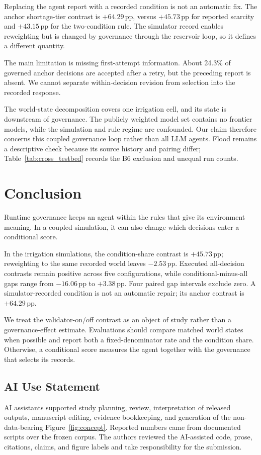 \documentclass{article}
\newcommand{\pp}{\,\mathrm{pp}}
\begin{document}
Replacing the agent report with a recorded condition is not an automatic fix. The anchor shortage-tier contrast is $+64.29\pp$, versus $+45.73\pp$ for reported scarcity and $+43.15\pp$ for the two-condition rule. The simulator record enables reweighting but is changed by governance through the reservoir loop, so it defines a different quantity.

The main limitation is missing first-attempt information. About 24.3\% of governed anchor decisions are accepted after a retry, but the preceding report is absent. We cannot separate within-decision revision from selection into the recorded response.

The world-state decomposition covers one irrigation cell, and its state is downstream of governance. The publicly weighted model set contains no frontier models, while the simulation and rule regime are confounded. Our claim therefore concerns this coupled governance loop rather than all LLM agents. Flood remains a descriptive check because its source history and pairing differ; Table~\ref{tab:cross_testbed} records the B6 exclusion and unequal run counts.

\section{Conclusion}

Runtime governance keeps an agent within the rules that give its environment meaning. In a coupled simulation, it can also change which decisions enter a conditional score.

In the irrigation simulations, the condition-share contrast is $+45.73\pp$; reweighting to the same recorded world leaves $-2.53\pp$. Executed all-decision contrasts remain positive across five configurations, while conditional-minus-all gaps range from $-16.06\pp$ to $+3.38\pp$. Four paired gap intervals exclude zero. A simulator-recorded condition is not an automatic repair; its anchor contrast is $+64.29\pp$.

We treat the validator-on/off contrast as an object of study rather than a governance-effect estimate. Evaluations should compare matched world states when possible and report both a fixed-denominator rate and the condition share. Otherwise, a conditional score measures the agent together with the governance that selects its records.

\subsection*{AI Use Statement}
AI assistants supported study planning, review, interpretation of released outputs, manuscript editing, evidence bookkeeping, and generation of the non-data-bearing Figure~\ref{fig:concept}. Reported numbers came from documented scripts over the frozen corpus. The authors reviewed the AI-assisted code, prose, citations, claims, and figure labels and take responsibility for the submission.
\end{document}
